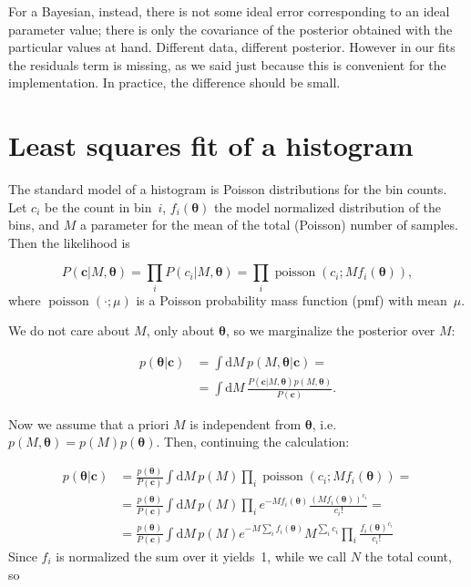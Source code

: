 
For a Bayesian, instead, there is not some ideal error corresponding to an
ideal parameter value; there is only the covariance of the posterior obtained
with the particular values at hand. Different data, different posterior.
However in our fits the residuals term is missing, as we said just because this
is convenient for the implementation. In practice, the difference should be
small.

\section{Least squares fit of a histogram}

The standard model of a histogram is Poisson distributions for the bin counts.
Let $c_i$ be the count in bin~$i$, $f_i(\boldsymbol\theta)$ the model
normalized distribution of the bins, and $M$ a parameter for the mean of the
total (Poisson) number of samples. Then the likelihood is

\begin{equation}
    P(\mathbf c|M,\boldsymbol\theta) =
    \prod_i P(c_i|M,\boldsymbol\theta) =
    \prod_i \operatorname{poisson}(c_i;Mf_i(\boldsymbol\theta)),
\end{equation}
%
where $\operatorname{poisson}(\cdot;\mu)$ is a Poisson probability mass
function (pmf) with mean~$\mu$.

We do not care about $M$, only about $\boldsymbol\theta$, so we marginalize
the posterior over $M$:

\begin{align}
    p(\boldsymbol\theta|\mathbf c)
    &= \int \mathrm dM\, p(M,\boldsymbol\theta|\mathbf c) = \\
    &= \int \mathrm dM\,
    \frac {P(\mathbf c|M,\boldsymbol\theta) p(M,\boldsymbol\theta)}
    {P(\mathbf c)}.
\end{align}

Now we assume that a priori $M$ is independent from $\boldsymbol\theta$, i.e.\ 
$p(M,\boldsymbol\theta) = p(M)p(\boldsymbol\theta)$. Then, continuing the
calculation:

\begin{align}
    p(\boldsymbol\theta|\mathbf c)
    &= \frac {p(\boldsymbol\theta)} {P(\mathbf c)}
    \int \mathrm dM\, p(M)
    \prod_i \operatorname{poisson}(c_i;Mf_i(\boldsymbol\theta)) = \\
    &= \frac {p(\boldsymbol\theta)} {P(\mathbf c)}
    \int \mathrm dM\, p(M)
    \prod_i
    e^{-Mf_i(\boldsymbol\theta)}
    \frac {(Mf_i(\boldsymbol\theta))^{c_i}} {c_i!} = \\
    &= \frac {p(\boldsymbol\theta)} {P(\mathbf c)}
    \int \mathrm dM\, p(M)
    e^{-M \sum_i f_i(\boldsymbol\theta)}
    M^{\sum_i c_i}
    \prod_i
    \frac {f_i(\boldsymbol\theta)^{c_i}} {c_i!}
\end{align}
%
Since $f_i$ is normalized the sum over it yields~1, while we call $N$ the total
count, so

